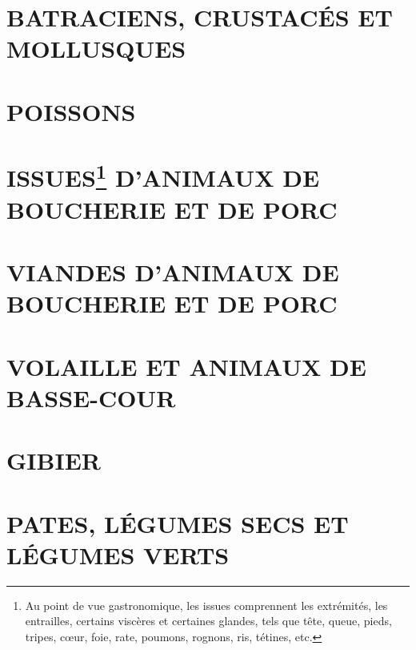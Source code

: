 \chapter*{\centering BATRACIENS, CRUSTACÉS ET MOLLUSQUES}


\chapter*{\centering POISSONS}


\chapter*{\centering ISSUES\footnote{ Au point de vue gastronomique, les issues
comprennent les extrémités, les entrailles, certains viscères et certaines
glandes, tels que tête, queue, pieds, tripes, cœur, foie, rate, poumons,
rognons, ris, tétines, etc.} D'ANIMAUX DE BOUCHERIE ET DE PORC}


\chapter*{\centering VIANDES D'ANIMAUX DE BOUCHERIE ET DE PORC}


\chapter*{\centering VOLAILLE ET ANIMAUX DE BASSE-COUR}


\chapter*{\centering GIBIER}


\chapter*{\centering PATES, LÉGUMES SECS ET LÉGUMES VERTS}


